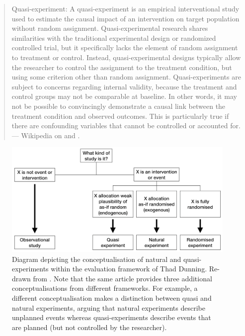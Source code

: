 \documentclass[
]{book}
\begin{document}
\begin{quote}
Quasi-experiment: A quasi-experiment is an empirical interventional study used to estimate the causal impact of an intervention on target population without random assignment. Quasi-experimental research shares similarities with the traditional experimental design or randomized controlled trial, but it specifically lacks the element of random assignment to treatment or control. Instead, quasi-experimental designs typically allow the researcher to control the assignment to the treatment condition, but using some criterion other than random assignment. Quasi-experiments are subject to concerns regarding internal validity, because the treatment and control groups may not be comparable at baseline. In other words, it may not be possible to convincingly demonstrate a causal link between the treatment condition and observed outcomes. This is particularly true if there are confounding variables that cannot be controlled or accounted for. --- Wikipedia on \citep{rossi1985evaluation} and \citep{dinardo2010natural}.
\end{quote}



\begin{figure}

{\centering \includegraphics[width=1\linewidth]{Figures/natural-experiments} 

}

\caption{Diagram depicting the conceptualisation of natural and quasi-experiments within the evaluation framework of Thad Dunning. Re-drawn from \citep{de2021conceptualising}. Note that the same article provides three additional conceptualisations from different frameworks. For example, a different conceptualisation makes a distinction between quasi and natural experiments, arguing that natural experiments describe unplanned events whereas quasi-experiments describe events that are planned (but not controlled by the researcher).}\label{fig:diagram-experiments}
\end{figure}
\end{document}
